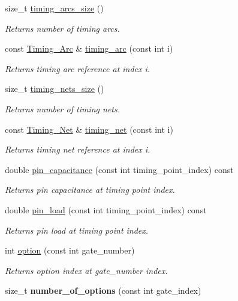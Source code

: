 \begin{DoxyCompactItemize}
size\-\_\-t \hyperlink{classTiming__Analysis_1_1Timing__Analysis_a239195867157ea06264afcdc3bb54e53}{timing\-\_\-arcs\-\_\-size} ()
\begin{DoxyCompactList}\small\item\em Returns number of timing arcs. \end{DoxyCompactList}\item 
const \hyperlink{classTiming__Analysis_1_1Timing__Arc}{Timing\-\_\-\-Arc} \& \hyperlink{classTiming__Analysis_1_1Timing__Analysis_ab51fd160e68b13a059efdcc460da1e83}{timing\-\_\-arc} (const int i)
\begin{DoxyCompactList}\small\item\em Returns timing arc reference at index i. \end{DoxyCompactList}\item 
size\-\_\-t \hyperlink{classTiming__Analysis_1_1Timing__Analysis_a0d0a28110de2017c754373f7a73c160d}{timing\-\_\-nets\-\_\-size} ()
\begin{DoxyCompactList}\small\item\em Returns number of timing nets. \end{DoxyCompactList}\item 
const \hyperlink{classTiming__Analysis_1_1Timing__Net}{Timing\-\_\-\-Net} \& \hyperlink{classTiming__Analysis_1_1Timing__Analysis_ab113f7930936110307c215a90e410769}{timing\-\_\-net} (const int i)
\begin{DoxyCompactList}\small\item\em Returns timing net reference at index i. \end{DoxyCompactList}\item 
double \hyperlink{classTiming__Analysis_1_1Timing__Analysis_a0263a18b53ef152589a3396423490f78}{pin\-\_\-capacitance} (const int timing\-\_\-point\-\_\-index) const 
\begin{DoxyCompactList}\small\item\em Returns pin capacitance at timing point index. \end{DoxyCompactList}\item 
double \hyperlink{classTiming__Analysis_1_1Timing__Analysis_a6569529b1614d4507d48293c7ea9f544}{pin\-\_\-load} (const int timing\-\_\-point\-\_\-index) const 
\begin{DoxyCompactList}\small\item\em Returns pin load at timing point index. \end{DoxyCompactList}\item 
int \hyperlink{classTiming__Analysis_1_1Timing__Analysis_a578a7940a493f7e6ab5ca4518984b8d4}{option} (const int gate\-\_\-number)
\begin{DoxyCompactList}\small\item\em Returns option index at gate\-\_\-number index. \end{DoxyCompactList}\item 
\hypertarget{classTiming__Analysis_1_1Timing__Analysis_a392a426d13c3d2258e07c553039af878}{size\-\_\-t {\bfseries number\-\_\-of\-\_\-options} (const int gate\-\_\-index)}\label{classTiming__Analysis_1_1Timing__Analysis_a392a426d13c3d2258e07c553039af878}


\end{DoxyCompactItemize}
